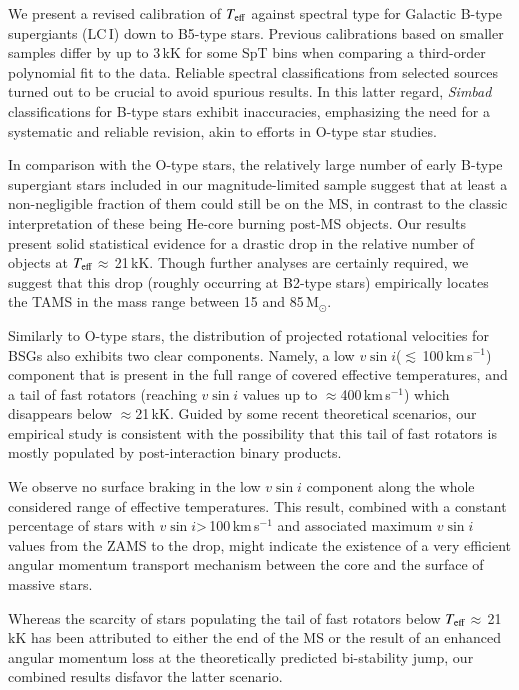 \documentclass{aa}
\newcommand{\vsini}{\mbox{$v\sin i$}\xspace}
\newcommand{\Teff}{\mbox{$T_{\rm eff}$}\xspace}
\newcommand{\kms}{\,\mbox{km\,s$^{-1}$}\xspace}
\newcommand{\MSol}{\,\mbox{M$_\odot$}\xspace}
\newcommand{\ls}{\mbox{$\lesssim$}\,}
\begin{document}
We present a revised calibration of \Teff against spectral type for Galactic B-type supergiants (LC\,I) down to B5-type stars. Previous calibrations based on smaller samples differ by up to 3\,kK for some SpT bins when comparing a third-order polynomial fit to the data. Reliable spectral classifications from selected sources turned out to be crucial to avoid spurious results. In this latter regard, \textit{Simbad} classifications for B-type stars exhibit inaccuracies, emphasizing the need for a systematic and reliable revision, akin to efforts in O-type star studies. 

In comparison with the O-type stars, the relatively large number of early B-type supergiant stars included in our magnitude-limited sample suggest that at least a non-negligible fraction of them could still be on the MS, in contrast to the classic interpretation of these being He-core burning post-MS objects. Our results present solid statistical evidence for a drastic drop in the relative number of objects at \Teff$\approx$\,21\,kK. Though further analyses are certainly required, we suggest that this drop (roughly occurring at B2-type stars) empirically locates the TAMS in the mass range between 15 and 85\MSol.

Similarly to O-type stars, the distribution of projected rotational velocities for BSGs also exhibits two clear components. Namely, a low \vsini (\ls100\kms) component that is present in the full range of covered effective temperatures, and a tail of fast rotators (reaching \vsini values up to $\approx$400\kms) which disappears below $\approx$21\,kK. Guided by some recent theoretical scenarios, our empirical study is consistent with the possibility that this tail of fast rotators is mostly populated by post-interaction binary products.

We observe no surface braking in the low \vsini component along the whole considered range of effective temperatures. This result, combined with a constant percentage of stars with \vsini>\,100\kms and associated maximum \vsini values from the ZAMS to the drop, might indicate the existence of a very efficient angular momentum transport mechanism between the core and the surface of massive stars.

Whereas the scarcity of stars populating the tail of fast rotators below \Teff$\approx$\,21\,kK has been attributed to either the end of the MS or the result of an enhanced angular momentum loss at the theoretically predicted bi-stability jump, our combined results disfavor the latter scenario. 
\end{document}
